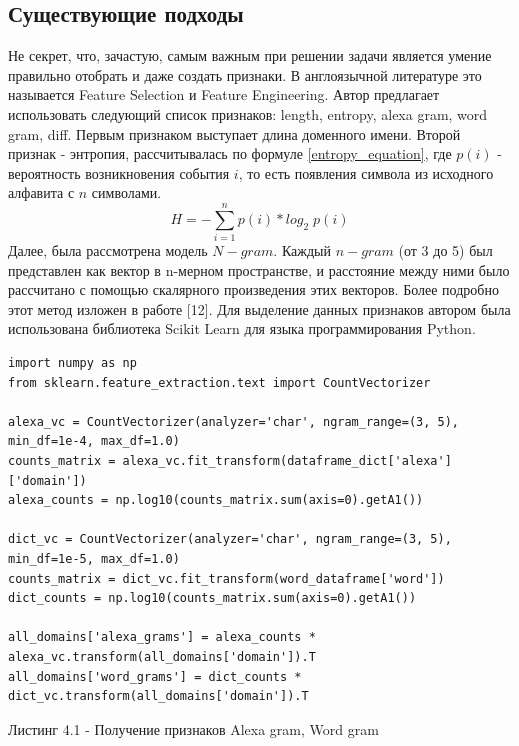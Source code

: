     \subsection{Существующие подходы}\label{be_class_exp}
    Не секрет, что, зачастую, самым важным при решении задачи является умение правильно отобрать и даже создать признаки. В англоязычной литературе это называется Feature Selection и Feature Engineering. Автор предлагает использовать следующий список признаков: length, entropy, alexa gram, word gram, diff.
    Первым признаком выступает длина доменного имени.
    Второй признак - энтропия, рассчитывалась по формуле \ref{entropy_equation}, где $p(i)$ - вероятность возникновения события $i$, то есть появления символа из исходного алфавита с $n$ символами.
    \begin{equation}\label{entropy_equation}
    H = - \sum_{i=1}^{n} p(i)*log_{2}\;p(i{})
    \end{equation}
    Далее, была рассмотрена модель $N-gram$. Каждый $n-gram$ (от 3 до 5) был представлен как вектор в n-мерном пространстве, и расстояние между ними было рассчитано с помощью скалярного произведения этих векторов. Более подробно этот метод изложен в работе [12].
    Для выделение данных признаков автором была использована библиотека Scikit Learn для языка программирования Python.
    \clearpage
    \begin{lstlisting}
import numpy as np
from sklearn.feature_extraction.text import CountVectorizer

alexa_vc = CountVectorizer(analyzer='char', ngram_range=(3, 5), min_df=1e-4, max_df=1.0)
counts_matrix = alexa_vc.fit_transform(dataframe_dict['alexa']['domain'])
alexa_counts = np.log10(counts_matrix.sum(axis=0).getA1())

dict_vc = CountVectorizer(analyzer='char', ngram_range=(3, 5), min_df=1e-5, max_df=1.0)
counts_matrix = dict_vc.fit_transform(word_dataframe['word'])
dict_counts = np.log10(counts_matrix.sum(axis=0).getA1())

all_domains['alexa_grams'] = alexa_counts * alexa_vc.transform(all_domains['domain']).T
all_domains['word_grams'] = dict_counts * dict_vc.transform(all_domains['domain']).T
    \end{lstlisting}
    Листинг 4.1 - Получение признаков Alexa gram, Word gram


